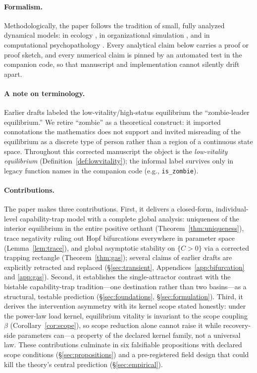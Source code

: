 \paragraph{Formalism.}
Methodologically, the paper follows the tradition of small, fully analyzed
dynamical models: in ecology
\citep{may1976simple,murray2002mathematical,scheffer2001catastrophic}, in
organizational simulation \citep{pluchino2010peter}, and in computational
psychopathology \citep{cramer2016depression}. Every analytical claim below
carries a proof or proof sketch, and every numerical claim is pinned by an
automated test in the companion code, so that manuscript and implementation
cannot silently drift apart.

\paragraph{A note on terminology.}
Earlier drafts labeled the low-vitality/high-status equilibrium the
``zombie-leader equilibrium.'' We retire ``zombie'' as a theoretical
construct: it imported connotations the mathematics does not support and
invited misreading of the equilibrium as a discrete type of person rather
than a region of a continuous state space. Throughout this corrected
manuscript the object is the \emph{low-vitality equilibrium}
(Definition~\ref{def:lowvitality}); the informal label survives only in
legacy function names in the companion code (e.g., \texttt{is\_zombie}).

\paragraph{Contributions.}
The paper makes three contributions. First, it delivers a closed-form,
individual-level capability-trap model with a complete global analysis:
uniqueness of the interior equilibrium in the entire positive orthant
(Theorem~\ref{thm:uniqueness}), trace negativity ruling out Hopf
bifurcations everywhere in parameter space (Lemma~\ref{lem:trace}), and
global asymptotic stability on $\{C>0\}$ via a corrected trapping rectangle
(Theorem~\ref{thm:gas}); several claims of earlier drafts are explicitly
retracted and replaced (\S\ref{sec:transient},
Appendices~\ref{app:bifurcation} and \ref{app:gas}). Second, it establishes
the single-attractor contrast with the bistable capability-trap
tradition---one destination rather than two basins---as a structural,
testable prediction (\S\ref{sec:foundations}, \S\ref{sec:formulation}).
Third, it derives the intervention asymmetry with its kernel scope stated
honestly: under the power-law load kernel, equilibrium vitality is
invariant to the scope coupling $\beta$ (Corollary~\ref{cor:scope}), so
scope reduction alone cannot raise it while recovery-side parameters
can---a property of the declared kernel family, not a universal law. These
contributions culminate in six falsifiable propositions with declared
scope conditions (\S\ref{sec:propositions}) and a pre-registered field
design that could kill the theory's central prediction
(\S\ref{sec:empirical}).

